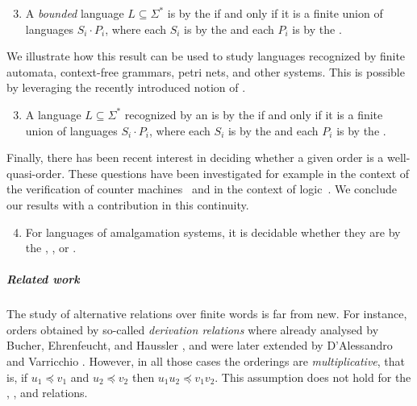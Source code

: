 {
\renewcommand{\labelenumi}{R\arabic{enumi}}
\begin{enumerate}
	\setcounter{enumi}{2}
    \item A \emph{bounded} language $L \subseteq \Sigma^*$ is  by the  if and only if it is a finite union of languages $S_i \cdot P_i$, where each $S_i$ is  by the  and each $P_i$ is  by the .
\end{enumerate}
}

We illustrate how this result can be used to study languages recognized by
finite automata, context-free grammars, petri nets, and other systems. This is
possible by leveraging the recently introduced notion of  \cite{ASZZ24}.

{
\renewcommand{\labelenumi}{R\arabic{enumi}}
\begin{enumerate}
	\setcounter{enumi}{2}
	\item A language $L \subseteq \Sigma^*$ recognized by an  is  by the  if and only if it is a finite union of languages $S_i \cdot P_i$, where each $S_i$ is  by the  and each $P_i$ is  by the .
\end{enumerate}
}


Finally, there has been recent interest in deciding whether a given order is a
well-quasi-order. These questions have been investigated for example in the
context of the verification of counter
machines~\cite{DBLP:conf/fsttcs/FinkelG19} and in the context of
logic~\cite{DBLP:journals/pacmpl/BergstrasserGLZ24}. We conclude our results
with a contribution in this continuity.

{
\renewcommand{\labelenumi}{R\arabic{enumi}}
\begin{enumerate}
	\setcounter{enumi}{3}
	\item For languages of amalgamation systems, it is decidable whether they are  by the , , or .
\end{enumerate}
}

\subparagraph{Related work} The study of alternative 
relations over finite words is far from new. For instance, orders obtained by
so-called \emph{derivation relations} where already analysed by Bucher,
Ehrenfeucht, and Haussler \cite{BUEUD85}, and were later extended by
D'Alessandro and Varricchio \cite{ALVA03,ALVA06}. However, in all those cases
the orderings are \emph{multiplicative}, that is, if $u_1 \preceq v_1$ and $u_2
\preceq v_2$ then $u_1u_2 \preceq v_1v_2$. This assumption does not hold for
the , , and  relations.

